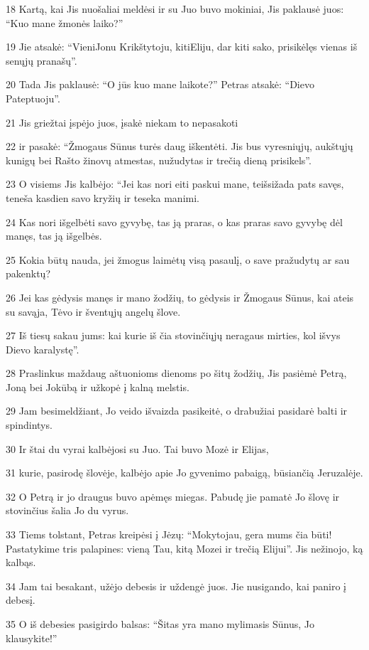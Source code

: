 \par 18 Kartą, kai Jis nuošaliai meldėsi ir su Juo buvo mokiniai, Jis paklausė juos: “Kuo mane žmonės laiko?” 
\par 19 Jie atsakė: “Vieni­Jonu Krikštytoju, kiti­Eliju, dar kiti sako, prisikėlęs vienas iš senųjų pranašų”. 
\par 20 Tada Jis paklausė: “O jūs kuo mane laikote?” Petras atsakė: “Dievo Pateptuoju”. 
\par 21 Jis griežtai įspėjo juos, įsakė niekam to nepasakoti 
\par 22 ir pasakė: “Žmogaus Sūnus turės daug iškentėti. Jis bus vyresniųjų, aukštųjų kunigų bei Rašto žinovų atmestas, nužudytas ir trečią dieną prisikels”. 
\par 23 O visiems Jis kalbėjo: “Jei kas nori eiti paskui mane, teišsižada pats savęs, teneša kasdien savo kryžių ir teseka manimi. 
\par 24 Kas nori išgelbėti savo gyvybę, tas ją praras, o kas praras savo gyvybę dėl manęs, tas ją išgelbės. 
\par 25 Kokia būtų nauda, jei žmogus laimėtų visą pasaulį, o save pražudytų ar sau pakenktų? 
\par 26 Jei kas gėdysis manęs ir mano žodžių, to gėdysis ir Žmogaus Sūnus, kai ateis su savąja, Tėvo ir šventųjų angelų šlove. 
\par 27 Iš tiesų sakau jums: kai kurie iš čia stovinčiųjų neragaus mirties, kol išvys Dievo karalystę”. 
\par 28 Praslinkus maždaug aštuonioms dienoms po šitų žodžių, Jis pasiėmė Petrą, Joną bei Jokūbą ir užkopė į kalną melstis. 
\par 29 Jam besimeldžiant, Jo veido išvaizda pasikeitė, o drabužiai pasidarė balti ir spindintys. 
\par 30 Ir štai du vyrai kalbėjosi su Juo. Tai buvo Mozė ir Elijas, 
\par 31 kurie, pasirodę šlovėje, kalbėjo apie Jo gyvenimo pabaigą, būsiančią Jeruzalėje. 
\par 32 O Petrą ir jo draugus buvo apėmęs miegas. Pabudę jie pamatė Jo šlovę ir stovinčius šalia Jo du vyrus. 
\par 33 Tiems tolstant, Petras kreipėsi į Jėzų: “Mokytojau, gera mums čia būti! Pastatykime tris palapines: vieną Tau, kitą Mozei ir trečią Elijui”. Jis nežinojo, ką kalbąs. 
\par 34 Jam tai besakant, užėjo debesis ir uždengė juos. Jie nusigando, kai paniro į debesį. 
\par 35 O iš debesies pasigirdo balsas: “Šitas yra mano mylimasis Sūnus, Jo klausykite!” 
